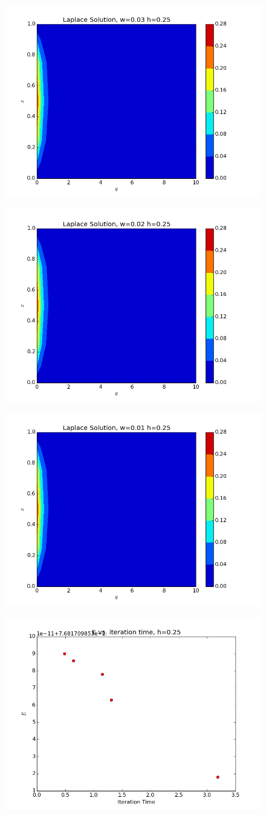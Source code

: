 \documentclass[10pt,letter]{article}
\begin{document}
\begin{figure}[H]
  \centering
    \includegraphics[width=.6\textwidth]{homework7_problem1_plot9}
\end{figure}
\begin{figure}[H]
  \centering
    \includegraphics[width=.6\textwidth]{homework7_problem1_plot10}
\end{figure}
\begin{figure}[H]
  \centering
    \includegraphics[width=.6\textwidth]{homework7_problem1_plot11}
\end{figure}
\begin{figure}[H]
  \centering
    \includegraphics[width=.6\textwidth]{homework7_problem1_plot12}
\end{figure}
\end{document}
